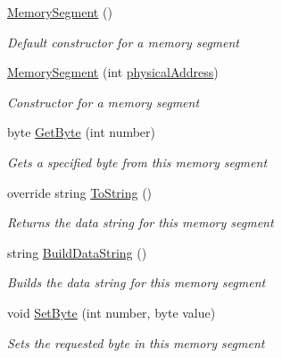 \begin{DoxyCompactItemize}
\item 
\hyperlink{class_c_p_u___o_s___simulator_1_1_memory_1_1_memory_segment_abd9c898ff9488aaee755f538a3197477}{Memory\+Segment} ()
\begin{DoxyCompactList}\small\item\em Default constructor for a memory segment \end{DoxyCompactList}\item 
\hyperlink{class_c_p_u___o_s___simulator_1_1_memory_1_1_memory_segment_a92848c6604c9d6a9d958783ad7cae24f}{Memory\+Segment} (int \hyperlink{class_c_p_u___o_s___simulator_1_1_memory_1_1_memory_segment_af6d25683cc2a80607238dda52b09d457}{physical\+Address})
\begin{DoxyCompactList}\small\item\em Constructor for a memory segment \end{DoxyCompactList}\item 
byte \hyperlink{class_c_p_u___o_s___simulator_1_1_memory_1_1_memory_segment_af3e1120c597c91c8f7aa7faf29d3eda0}{Get\+Byte} (int number)
\begin{DoxyCompactList}\small\item\em Gets a specified byte from this memory segment \end{DoxyCompactList}\item 
override string \hyperlink{class_c_p_u___o_s___simulator_1_1_memory_1_1_memory_segment_a1c94b824fe1fdfc4a0b817a031f3d51d}{To\+String} ()
\begin{DoxyCompactList}\small\item\em Returns the data string for this memory segment \end{DoxyCompactList}\item 
string \hyperlink{class_c_p_u___o_s___simulator_1_1_memory_1_1_memory_segment_a7ad206d46b52b795ba48018afe0174ed}{Build\+Data\+String} ()
\begin{DoxyCompactList}\small\item\em Builds the data string for this memory segment \end{DoxyCompactList}\item 
void \hyperlink{class_c_p_u___o_s___simulator_1_1_memory_1_1_memory_segment_ab445c7247c0ca2a7b52606b4d14e268a}{Set\+Byte} (int number, byte value)
\begin{DoxyCompactList}\small\item\em Sets the requested byte in this memory segment \end{DoxyCompactList}\end{DoxyCompactItemize}
